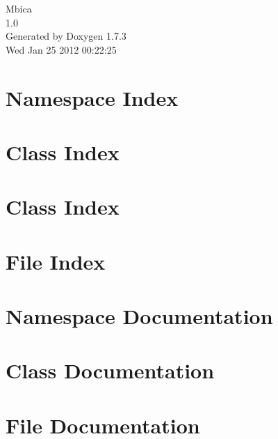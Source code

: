 \documentclass[a4paper]{book}
\begin{document}
\hypersetup{pageanchor=false}
\begin{titlepage}
\vspace*{7cm}
\begin{center}
{\Large Mbica \\[1ex]\large 1.0 }\\
\vspace*{1cm}
{\large Generated by Doxygen 1.7.3}\\
\vspace*{0.5cm}
{\small Wed Jan 25 2012 00:22:25}\\
\end{center}
\end{titlepage}
\clearemptydoublepage
{}
\tableofcontents
\clearemptydoublepage
{}
\hypersetup{pageanchor=true}
\chapter{Namespace Index}

\chapter{Class Index}

\chapter{Class Index}

\chapter{File Index}

\chapter{Namespace Documentation}



\chapter{Class Documentation}











\chapter{File Documentation}









\printindex
\end{document}
